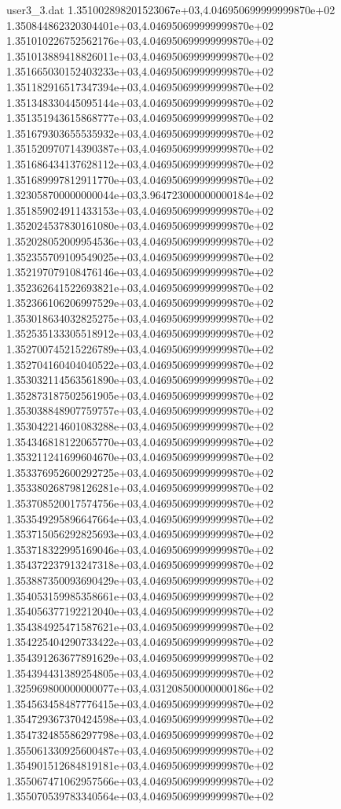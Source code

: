 \begin{filecontents}{user3_3.dat}
1.351002898201523067e+03,4.046950699999999870e+02
1.350844862320304401e+03,4.046950699999999870e+02
1.351010226752562176e+03,4.046950699999999870e+02
1.351013889418826011e+03,4.046950699999999870e+02
1.351665030152403233e+03,4.046950699999999870e+02
1.351182916517347394e+03,4.046950699999999870e+02
1.351348330445095144e+03,4.046950699999999870e+02
1.351351943615868777e+03,4.046950699999999870e+02
1.351679303655535932e+03,4.046950699999999870e+02
1.351520970714390387e+03,4.046950699999999870e+02
1.351686434137628112e+03,4.046950699999999870e+02
1.351689997812911770e+03,4.046950699999999870e+02
1.323058700000000044e+03,3.964723000000000184e+02
1.351859024911433153e+03,4.046950699999999870e+02
1.352024537830161080e+03,4.046950699999999870e+02
1.352028052009954536e+03,4.046950699999999870e+02
1.352355709109549025e+03,4.046950699999999870e+02
1.352197079108476146e+03,4.046950699999999870e+02
1.352362641522693821e+03,4.046950699999999870e+02
1.352366106206997529e+03,4.046950699999999870e+02
1.353018634032825275e+03,4.046950699999999870e+02
1.352535133305518912e+03,4.046950699999999870e+02
1.352700745215226789e+03,4.046950699999999870e+02
1.352704160404040522e+03,4.046950699999999870e+02
1.353032114563561890e+03,4.046950699999999870e+02
1.352873187502561905e+03,4.046950699999999870e+02
1.353038848907759757e+03,4.046950699999999870e+02
1.353042214601083288e+03,4.046950699999999870e+02
1.354346818122065770e+03,4.046950699999999870e+02
1.353211241699604670e+03,4.046950699999999870e+02
1.353376952600292725e+03,4.046950699999999870e+02
1.353380268798126281e+03,4.046950699999999870e+02
1.353708520017574756e+03,4.046950699999999870e+02
1.353549295896647664e+03,4.046950699999999870e+02
1.353715056292825693e+03,4.046950699999999870e+02
1.353718322995169046e+03,4.046950699999999870e+02
1.354372237913247318e+03,4.046950699999999870e+02
1.353887350093690429e+03,4.046950699999999870e+02
1.354053159985358661e+03,4.046950699999999870e+02
1.354056377192212040e+03,4.046950699999999870e+02
1.354384925471587621e+03,4.046950699999999870e+02
1.354225404290733422e+03,4.046950699999999870e+02
1.354391263677891629e+03,4.046950699999999870e+02
1.354394431389254805e+03,4.046950699999999870e+02
1.325969800000000077e+03,4.031208500000000186e+02
1.354563458487776415e+03,4.046950699999999870e+02
1.354729367370424598e+03,4.046950699999999870e+02
1.354732485586297798e+03,4.046950699999999870e+02
1.355061330925600487e+03,4.046950699999999870e+02
1.354901512684819181e+03,4.046950699999999870e+02
1.355067471062957566e+03,4.046950699999999870e+02
1.355070539783340564e+03,4.046950699999999870e+02

\end{filecontents}
